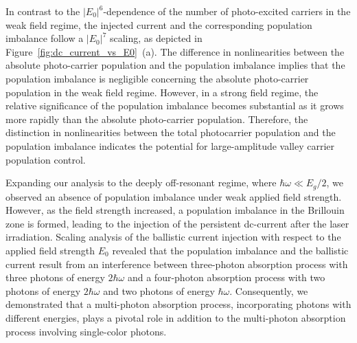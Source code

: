 In contrast to the $|E_0|^6$-dependence of the number of photo-excited carriers in the weak field regime, the injected current and the corresponding population imbalance follow a $|E_0|^7$ scaling, as depicted in Figure~\ref{fig:dc_current_vs_E0}~(a). The difference in nonlinearities between the absolute photo-carrier population and the population imbalance implies that the population imbalance is negligible concerning the absolute photo-carrier population in the weak field regime. However, in a strong field regime, the relative significance of the population imbalance becomes substantial as it grows more rapidly than the absolute photo-carrier population. Therefore, the distinction in nonlinearities between the total photocarrier population and the population imbalance indicates the potential for large-amplitude valley carrier population control.

Expanding our analysis to the deeply off-resonant regime, where $\hbar \omega \ll E_g/2$, we observed an absence of population imbalance under weak applied field strength. However, as the field strength increased, a population imbalance in the Brillouin zone is formed, leading to the injection of the persistent dc-current after the laser irradiation. Scaling analysis of the ballistic current injection with respect to the applied field strength $E_0$ revealed that the population imbalance and the ballistic current result from an interference between three-photon absorption process with three photons of energy $2\hbar \omega$ and a four-photon absorption process with two photons of energy $2\hbar \omega$ and two photons of energy $\hbar \omega$. Consequently, we demonstrated that a multi-photon absorption process, incorporating photons with different energies, plays a pivotal role in addition to the multi-photon absorption process involving single-color photons.


